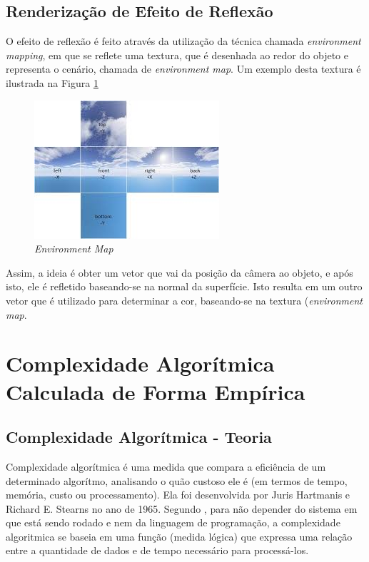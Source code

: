 {	\subsection{Renderização de Efeito de Reflexão}
	\label{ref_t}

	O efeito de reflexão é feito através da utilização da técnica chamada \textit{environment mapping}, em que se reflete uma textura, que é desenhada ao redor do objeto e representa o cenário, chamada de \textit{environment map}. Um exemplo desta textura é ilustrada na Figura \ref{environment}

	\begin{figure}[ht]
	\centering
		\includegraphics[keepaspectratio=true,scale=1.0]{figuras/envmap.jpg}
	\caption{\textit{Environment Map}}
	\label{environment}
	\end{figure}

	Assim, a ideia é obter um vetor que vai da posição da câmera ao objeto, e após isto, ele é refletido baseando-se na normal da superfície. Isto resulta em um outro vetor que é utilizado para determinar a cor, baseando-se na textura (\textit{environment map}.

\section{Complexidade Algorítmica Calculada de Forma Empírica}

	\subsection{Complexidade Algorítmica - Teoria}

	Complexidade algorítmica é uma medida que compara a eficiência de um determinado algorítmo, analisando o quão custoso ele é (em termos de tempo, memória, custo ou processamento). Ela foi desenvolvida por Juris Hartmanis e Richard E. Stearns no ano de 1965. Segundo \cite{complexidade}, para não depender do sistema em que está sendo rodado e nem da linguagem de programação, a complexidade algoritmica se baseia em uma função (medida lógica) que expressa uma relação entre a quantidade de dados e de tempo necessário para processá-los.

}
